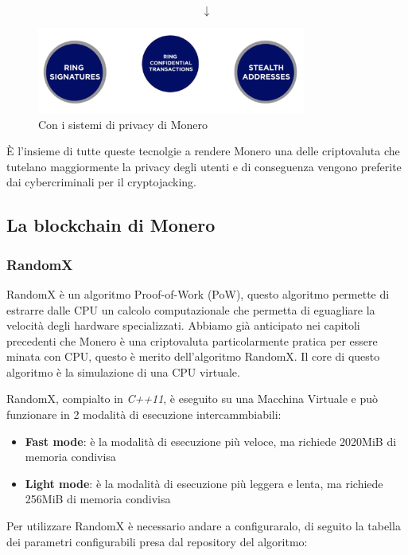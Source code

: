 \documentclass[12pt,a4paper]{article}
\begin{document}
$$ \downarrow $$

\begin{figure}[ht]
    \centering
    \includegraphics[width=0.79\textwidth]{./images/after.png}
    \caption{Con i sistemi di privacy di Monero}
    \label{fig:summary}
\end{figure}

È l'insieme di tutte queste tecnolgie a rendere Monero una delle criptovaluta che tutelano maggiormente la privacy degli utenti e di conseguenza vengono preferite dai cybercriminali per il cryptojacking.

\subsection{La blockchain di Monero}

\subsubsection*{RandomX}
RandomX è un algoritmo Proof-of-Work (PoW), questo algoritmo permette di
estrarre dalle CPU un calcolo computazionale che permetta di eguagliare la
velocità degli hardware specializzati. Abbiamo già anticipato nei capitoli
precedenti che Monero è una criptovaluta particolarmente pratica per essere
minata con CPU, questo è merito dell'algoritmo RandomX. Il core di questo
algoritmo è la simulazione di una CPU virtuale.

RandomX, compialto in \textit{C++11}, è eseguito su una Macchina Virtuale e può
funzionare in 2 modalità di esecuzione intercammbiabili:

\begin{itemize}
    \item \textbf{Fast mode}: è la modalità di esecuzione più veloce, ma
    richiede 2020MiB di memoria condivisa
    \item \textbf{Light mode}: è la modalità di esecuzione più leggera e lenta,
    ma richiede 256MiB di memoria condivisa
\end{itemize}

Per utilizzare RandomX è necessario andare a configuraralo, di seguito la
tabella dei parametri configurabili presa dal repository del algoritmo:
\end{document}
